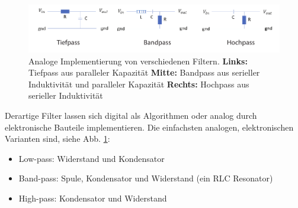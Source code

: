 \begin{figure}[tbp]
    \centering
        \includegraphics[width=\textwidth]{Figures/filter.pdf}
        \caption{Analoge Implementierung von verschiedenen Filtern. \textbf{Links:} Tiefpass aus paralleler Kapazität \textbf{Mitte:} Bandpass aus serieller Induktivität und paralleler Kapazität \textbf{Rechts:} Hochpass aus serieller Induktivität}
        \label{fig:analogueFilters}
\end{figure}


Derartige Filter lassen sich digital als Algorithmen oder analog durch elektronische Bauteile implementieren. Die einfachsten analogen, elektronischen Varianten sind, siehe Abb. \ref{fig:analogueFilters}:
\begin{itemize}
\setlength\itemsep{0em}
    \item Low-pass: Widerstand und Kondensator
    \item Band-pass: Spule, Kondensator und Widerstand (ein RLC Resonator)
    \item High-pass: Kondensator und Widerstand
\end{itemize}

